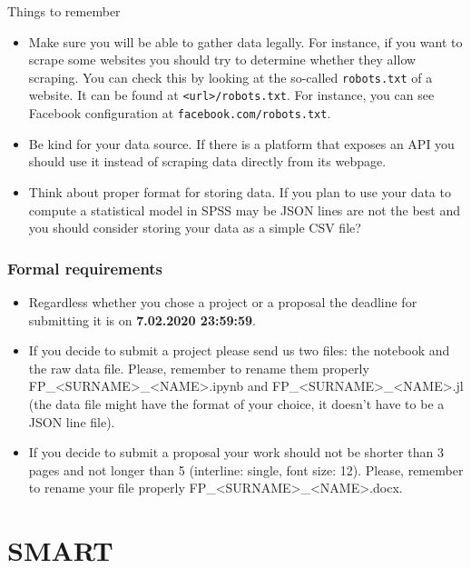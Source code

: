 \begin{frame}{Things to remember}
\begin{itemize}
 \item Make sure you will be able to gather data legally.
 For instance, if you want to scrape some websites you should try to determine whether they allow scraping. You can check this by
 looking at the so-called \texttt{robots.txt} of a website.
 It can be found at \texttt{<url>/robots.txt}. For instance,
 you can see Facebook configuration at \texttt{facebook.com/robots.txt}.
 \item Be kind for your data source. If there is a platform that exposes an API you should use it instead of scraping data directly from its webpage.
 \item Think about proper format for storing data. If you plan to use your data to compute a statistical model in SPSS may be JSON lines are not the best and you should consider storing your data as a simple CSV file?
\end{itemize}
\end{frame}

\begin{frame}
    \frametitle{Formal requirements}
    \begin{itemize}
        \item Regardless whether you chose a project or a proposal the deadline for submitting it is on \textbf{7.02.2020 23:59:59}.
        \item If you decide to submit a project please send us two files: the notebook and the raw data file. Please, remember to rename them properly FP\_<SURNAME>\_<NAME>.ipynb and FP\_<SURNAME>\_<NAME>.jl (the data file might have the format of your choice, it doesn't have to be a JSON line file).
        \item If you decide to submit a proposal your work should not be shorter than 3 pages and not longer than 5 (interline: single, font size: 12). Please, remember to rename your file properly FP\_<SURNAME>\_<NAME>.docx.
    \end{itemize}
\end{frame}

\section{SMART}


